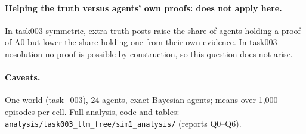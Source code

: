 \documentclass[10pt,a4paper]{article}
\begin{document}
\paragraph{Helping the truth versus agents' own proofs: does not apply here.} In
task003-symmetric, extra truth posts raise the share of agents holding a proof of A0 but
lower the share holding one from their own evidence. In task003-nosolution no proof is
possible by construction, so this question does not arise.

\paragraph{Caveats.} One world (task\_003), 24 agents, exact-Bayesian agents; means over
1,000 episodes per cell. Full analysis, code and tables:
\texttt{analysis/task003\_llm\_free/sim1\_analysis/} (reports Q0--Q6).
\end{document}
